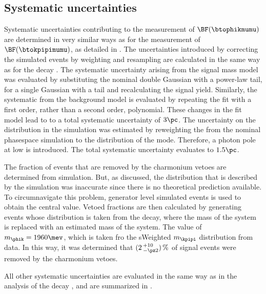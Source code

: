 

\subsection{Systematic uncertainties}
\label{ssec:phik:syst}

Systematic uncertainties contributing to the measurement of $\BF(\btophikmumu)$ are determined in
very similar ways as for the measurement of $\BF(\btokpipimumu)$, as detailed in
.
The uncertainties introduced by correcting the simulated events by weighting and resampling are
calculated in the same way as for the decay \btokpipimumu.
The systematic uncertainty arising from the signal mass model was evaluated by
substituting the nominal double Gaussian with a power-law tail, for a single Gaussian with a tail
and recalculating the signal yield.
Similarly, the systematic from the background model is evaluated by repeating the fit with a first
order, rather than a second order, polynomial.
These changes in the fit model lead to to a total systematic uncertainty of \approx$3\pc$.
The uncertainty on the \qsq distribution in the simulation was estimated by reweighting the from
the nominal phasespace simulation to the distribution of the  mode.
Therefore, a photon pole at low \qsq is introduced.
The total systematic uncertainty evaluates to \approx$1.5\pc$.

The fraction of events that are removed by the charmonium vetoes are determined from simulation.
But, as discussed, the \qsq distribution that is described by the \btophikmumu simulation was
inaccurate since there is no theoretical prediction available.
To circumnavigate this problem, generator level simulated events is used to obtain the central
value.
Vetoed fractions are then calculated by generating events whose \qsq distribution is taken from the
 decay, where the mass of the  system is replaced with an
estimated mass of the \phik system.
The value of $m_{\phik}=1960\mev$, which is taken fro the sWeighted $m_{\kpipi}$ distribution from
data.
In this way, it was determined that $(2\,^{+10}_{-\pz2})\,\%$ of signal events were removed by the
charmonium vetoes.

All other systematic uncertainties are evaluated in the same way as in the analysis of the decay
\btokpipimumu, and are summarized in .


